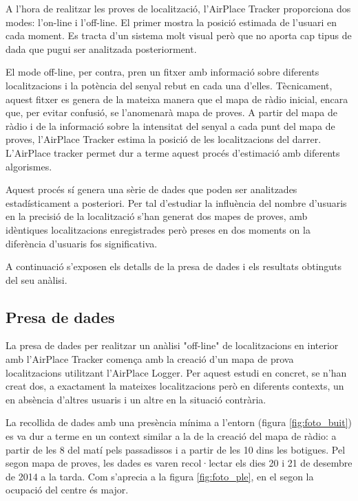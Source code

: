 
A l'hora de realitzar les proves de localització, l'AirPlace Tracker proporciona dos modes: l'on-line i l'off-line. El primer mostra la posició estimada de l'usuari en cada moment. Es tracta d'un sistema molt visual però que no aporta cap tipus de dada que pugui ser analitzada posteriorment.

El mode off-line, per contra, pren un fitxer amb informació sobre diferents localitzacions i la potència del senyal rebut en cada una d'elles. Tècnicament, aquest fitxer es genera de la mateixa manera que el mapa de ràdio inicial, encara que, per evitar confusió, se l'anomenarà mapa de proves. A partir del mapa de ràdio i de la informació sobre la intensitat del senyal a cada punt del mapa de proves, l'AirPlace Tracker estima la posició de les localitzacions del darrer. L'AirPlace tracker permet dur a terme aquest procés d'estimació amb diferents algorismes.

Aquest procés sí genera una sèrie de dades que poden ser analitzades estadísticament a posteriori. Per tal d'estudiar la influència del nombre d'usuaris en la precisió de la localització s'han generat dos mapes de proves, amb idèntiques localitzacions enregistrades però preses en dos moments on la diferència d'usuaris fos significativa.

A continuació s'exposen els detalls de la presa de dades i els resultats obtinguts del seu anàlisi.

\subsection{Presa de dades}

La presa de dades per realitzar un anàlisi "off-line" de localitzacions en interior amb l'AirPlace Tracker comença amb la creació d'un mapa de prova localitzacions utilitzant l'AirPlace Logger. Per aquest estudi en concret, se n'han creat dos, a exactament la mateixes localitzacions però en diferents contexts, un en absència d'altres usuaris i un altre en la situació contrària.

La recollida de dades amb una presència mínima a l'entorn (figura \ref{fig:foto_buit}) es va dur a terme en un context similar a la de la creació del mapa de ràdio: a partir de les 8 del matí pels passadissos i a partir de les 10 dins les botigues. Pel segon mapa de proves, les dades es varen recol·lectar els dies 20 i 21 de desembre de 2014 a la tarda. Com s'aprecia a la figura \ref{fig:foto_ple}, en el segon la ocupació del centre és major.

